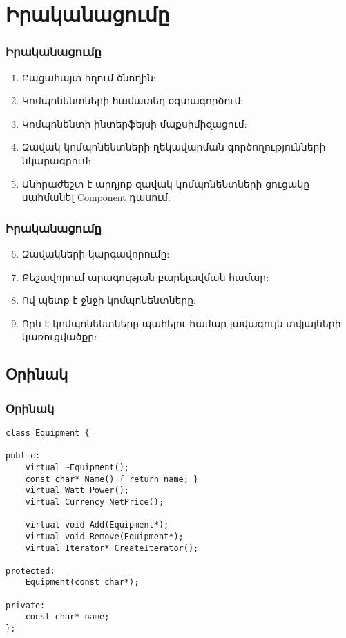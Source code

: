 \documentclass{beamer}
\begin{document}
\section{Իրականացումը}
\begin{frame}\frametitle{Իրականացումը}
\begin{enumerate}
    \item Բացահայտ հղում ծնողին: \vfill
    \item Կոմպոնենտների համատեղ օգտագործում: \vfill
    \item Կոմպոնենտի ինտերֆեյսի մաքսիմիզացում: \vfill
    \item Զավակ կոմպոնենտների ղեկավարման գործողությունների նկարագրում: \vfill
    \item Անհրաժեշտ է արդյոք զավակ կոմպոնենտների ցուցակը սահմանել Component դասում:
\end{enumerate}
\end{frame}

\begin{frame}\frametitle{Իրականացումը}
\begin{enumerate}
    \setcounter{enumi}{5}
    \item Զավակների կարգավորումը: \vfill
    \item Քեշավորում արագության բարելավման համար: \vfill
    \item Ով պետք է ջնջի կոմպոնենտները: \vfill
    \item Որն է կոմպոնենտները պահելու համար լավագույն տվյալների կառուցվածքը:
\end{enumerate}
\end{frame}

\subsection{Օրինակ}
\begin{frame}[fragile]\frametitle{Օրինակ}
\begin{english}
\begin{verbatim}
class Equipment {

public:
    virtual ~Equipment();
    const char* Name() { return name; }
    virtual Watt Power();
    virtual Currency NetPrice();

    virtual void Add(Equipment*);
    virtual void Remove(Equipment*);
    virtual Iterator* CreateIterator();

protected:
    Equipment(const char*);

private:
    const char* name;
};
\end{verbatim}
\end{english}
\end{frame}
\end{document}
